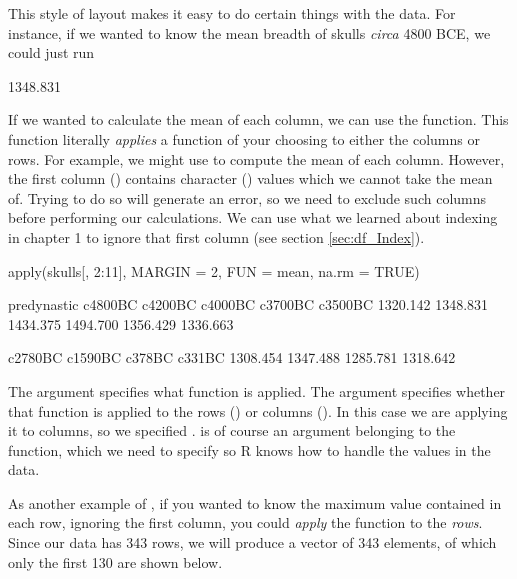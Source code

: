 This style of layout makes it easy to do certain things with the data. For instance, if we wanted to know the mean breadth of skulls \textit{circa} 4800 BCE, we could just run 


\begin{outR}
[1] 1348.831
\end{outR}

If we wanted to calculate the mean of each column, we can use the  function. This function literally \textit{applies} a function of your choosing to either the columns or rows. For example, we might use  to compute the mean of each column. However, the first column () contains character () values which we cannot take the mean of. Trying to do so will generate an error, so we need to exclude such columns before performing our calculations. We can use what we learned about indexing in chapter 1 to ignore that first column (see section \ref{sec:df_Index}).

\begin{inR}
apply(skulls[, 2:11], MARGIN = 2, FUN = mean, na.rm = TRUE)
\end{inR}

\begin{outR}
predynastic     c4800BC     c4200BC     c4000BC     c3700BC     c3500BC 
   1320.142    1348.831    1434.375    1494.700    1356.429    1336.663 
   
    c2780BC     c1590BC      c378BC      c331BC 
   1308.454    1347.488    1285.781    1318.642 
\end{outR}

\noindent
The argument  specifies what function is applied. The argument  specifies whether that function is applied to the rows () or columns (). In this case we are applying it to columns, so we specified .  is of course an argument belonging to the  function, which we need to specify so R knows how to handle the  values in the data.

As another example of , if you wanted to know the maximum value contained in each row, ignoring the first column, you could \textit{apply} the function  to the \textit{rows}. Since our data has 343 rows, we will produce a vector of 343 elements, of which only the first 130 are shown below.

